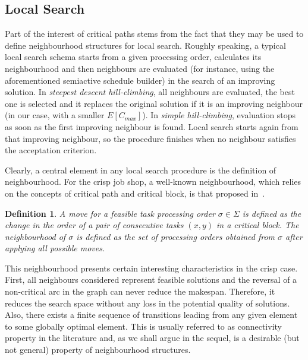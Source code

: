 \documentclass[letterpaper]{article}
\newtheorem{definition}{Definition}
\begin{document}
\subsection{Local Search}\label{subsecLocalSearch}
Part of the interest of critical paths stems from the fact that they may be used to define neighbourhood structures for local search. Roughly speaking, a typical local search schema starts from a given processing order, calculates its neighbourhood and then neighbours are evaluated (for instance, using the aforementioned semiactive schedule builder) in the search of an improving solution. In \emph{steepest descent hill-climbing}, all neighbours are evaluated, the best one is selected and it replaces the original solution if it is an improving neighbour (in our case, with a smaller $E[C_{max}]$). In \emph{simple hill-climbing}, evaluation stops as soon as the first improving neighbour is found. Local search starts again from that improving neighbour, so the procedure finishes when no neighbour satisfies the acceptation criterion.

Clearly, a central element in any local search procedure is the definition of neighbourhood. For the crisp job shop, a well-known neighbourhood, which relies on the concepts of critical path and critical block, is that proposed in~\cite{VanLaarhoven1992}.
\begin{definition}
A \emph{move} for a feasible task processing order $\sigma \in \Sigma$ is defined as the change in the order of a pair of consecutive tasks $(x,y)$ in a critical block. The \emph{neighbourhood} of $\sigma$ is defined as the set of processing orders obtained from $\sigma$ after applying all possible moves.
\end{definition}
This neighbourhood presents certain interesting characteristics in the crisp case. First, all neighbours considered represent feasible solutions and the reversal of a non-critical arc in the graph can never reduce the makespan. Therefore, it reduces the search space without any loss in the potential quality of solutions. Also, there exists a finite sequence of transitions leading from any given element to some globally optimal element. This is usually referred to as connectivity property in the literature and, as we shall argue in the sequel, is a desirable (but not general) property of neighbourhood structures.

%
\end{document}
